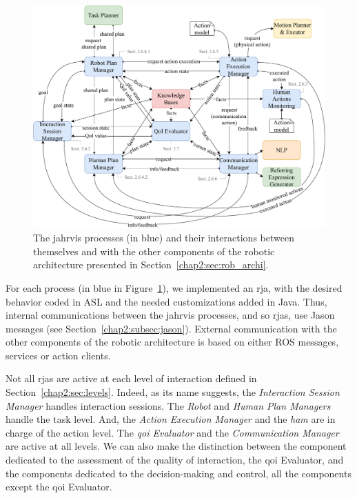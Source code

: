 \documentclass[a4paper,11pt,twoside]{StyleThese}
\begin{document}
\begin{figure}[!ht]
	\includegraphics[width=\linewidth]{figures/chapter2/supervisor_modules.pdf}
	\caption{The \acrshort{jahrvis} processes (in blue) and their interactions between themselves and with the other components of the robotic architecture presented in Section~\ref{chap2:sec:rob_archi}.}
	\label{chap2:fig:sup_overview}
\end{figure}

For each process (in blue in Figure~\ref{chap2:fig:sup_overview}), we implemented an \acrshort{rja}, with the desired behavior coded in ASL and the needed customizations added in Java. Thus, internal communications between the \acrshort{jahrvis} processes, and so \acrshort{rja}s, use Jason messages (see Section~\ref{chap2:subsec:jason}). External communication with the other components of the robotic architecture is based on either ROS messages, services or action clients.

Not all \acrshort{rja}s are active at each level of interaction defined in Section~\ref{chap2:sec:levels}. Indeed, as its name suggests, the \textit{Interaction Session Manager} handles interaction sessions. The \textit{Robot} and \textit{Human Plan Managers} handle the task level. And, the \textit{Action Execution Manager} and the \textit{\acrlong{ham}} are in charge of the action level. The \textit{\acrshort{qoi} Evaluator} and the \textit{Communication Manager} are active at all levels. We can also make the distinction between the component dedicated to the assessment of the quality of interaction, \ie the \acrshort{qoi} Evaluator, and the components dedicated to the decision-making and control, \ie all the components except the \acrshort{qoi} Evaluator.
\end{document}
